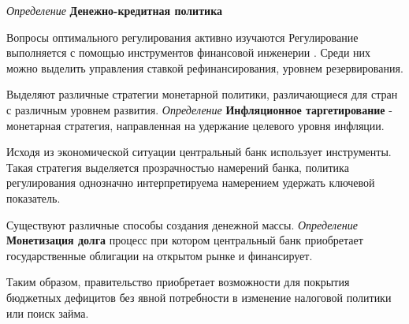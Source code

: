 
\textit{Определение} \textbf{Денежно-кредитная политика } 

Вопросы оптимального регулирования активно изучаются \cite{нэш2008идеальные}
Регулирование выполняется с помощью инструментов финансовой инженерии \cite{архипов2007предпосылки}. Среди них можно выделить управления ставкой рефинансирования, уровнем резервирования. 



Выделяют различные стратегии монетарной политики, различающиеся для стран с различным уровнем развития. 
\textit{Определение} \textbf{Инфляционное таргетирование} \cite{bernanke1997inflation} - монетарная стратегия, направленная на удержание целевого уровня инфляции. 

Исходя из экономической ситуации центральный банк использует инструменты. Такая стратегия выделяется прозрачностью намерений банка, политика регулирования однозначно интерпретируема намерением удержать ключевой показатель.

Существуют различные способы создания денежной массы.
\textit{Определение} \textbf{Монетизация долга} процесс при котором центральный банк приобретает государственные облигации на открытом рынке и финансирует. 

Таким образом, правительство приобретает возможности для покрытия бюджетных дефицитов без явной потребности в изменение налоговой политики или поиск займа.

